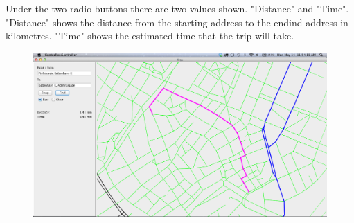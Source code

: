 Under the two radio buttons there are two values shown. "Distance" and "Time". "Distance" shows the distance from the starting address to the endind address in kilometres. "Time" shows the estimated time that the trip will take. \\
\begin{figure}[htb]
\centering
\includegraphics[scale=0.25]{User_manual/screenshot.png}
\end{figure}
